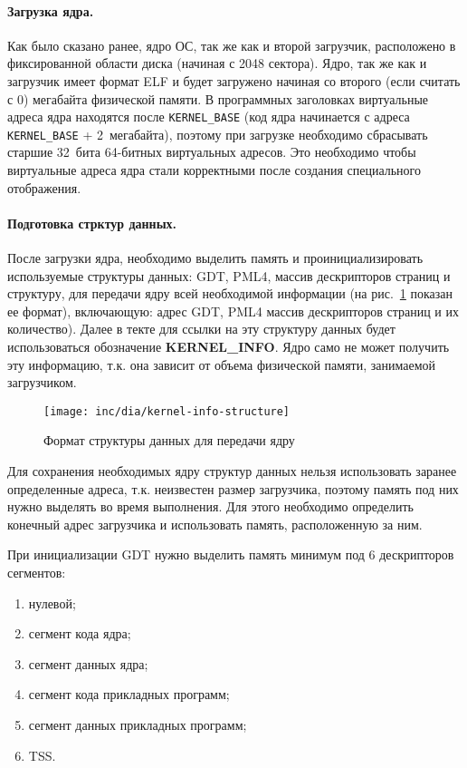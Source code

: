 \paragraph{Загрузка ядра.} Как было сказано ранее, ядро ОС, так же как и второй загрузчик,
расположено в фиксированной области диска (начиная с 2048 сектора). Ядро, так же как и загрузчик
имеет формат ELF и будет загружено начиная со второго (если считать с 0) мегабайта физической
памяти. В программных заголовках виртуальные адреса ядра находятся после \texttt{KERNEL\_BASE} (код
ядра начинается с адреса \texttt{KERNEL\_BASE} + 2~мегабайта), поэтому при загрузке необходимо
сбрасывать старшие 32~бита 64-битных виртуальных адресов. Это необходимо чтобы виртуальные адреса
ядра стали корректными после создания специального отображения.

\paragraph{Подготовка стрктур данных.} После загрузки ядра, необходимо выделить память и проинициализировать
используемые структуры данных: GDT, PML4, массив дескрипторов страниц и структуру, для передачи
ядру всей необходимой информации (на рис.~\ref{fig:kernel-info-structure} показан ее формат), включающую:
адрес GDT, PML4 массив дескрипторов страниц и их количество). Далее в текте для ссылки на эту структуру
данных будет использоваться обозначение \textbf{KERNEL\_INFO}. Ядро само не может получить эту информацию,
т.к. она зависит от объема физической памяти, занимаемой загрузчиком.

\begin{figure}[ht!]
  \centering
  \texttt{[image: inc/dia/kernel-info-structure]}
  \caption{Формат структуры данных для передачи ядру}
  \label{fig:kernel-info-structure}
\end{figure}

Для сохранения необходимых ядру структур данных нельзя использовать заранее определенные адреса,
т.к. неизвестен размер загрузчика, поэтому память под них нужно выделять во время выполнения. Для
этого необходимо определить конечный адрес загрузчика и использовать память, расположенную за ним.

При инициализации GDT нужно выделить память минимум под 6 дескрипторов сегментов:
\begin{enumerate}[1.]
\item нулевой;
\item сегмент кода ядра;
\item сегмент данных ядра;
\item сегмент кода прикладных программ;
\item сегмент данных прикладных программ;
\item TSS.
\end{enumerate}

